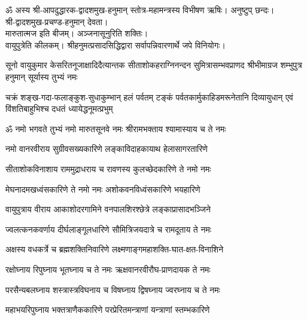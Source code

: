 
ॐ अस्य श्री-आपदुद्धारक-द्वादशमुख-हनुमान् स्तोत्र-महामन्त्रस्य विभीषण ऋषिः। अनुष्टुप् छन्दः।\\
श्री-द्वादशमुख-प्रचण्ड-हनुमान् देवता।\\
 मारुतात्मज इति बीजम्। अञ्जनासूनुरिति शक्तिः।\\
वायुपुत्रेति कीलकम्। श्रीहनुमत्प्रसादसिद्धिद्वारा सर्वापन्निवारणार्थे जपे विनियोगः।

{सूनो वायुकुमार केसरितनूजाक्षादिदैत्यान्तक}
{सीताशोकहराग्निनन्दन सुमित्रासम्भवप्राणद}
{श्रीभीमाग्रज शम्भुपुत्र हनुमान् सूर्यास्य तुभ्यं नमः}

{चक्रं शङ्ख-गदा-फलाङ्कुश-सुधाकुम्भान् हलं पर्वतम्}
{टङ्कं पर्वतकार्मुकाहिडमरूनेतानि दिव्यायुधान्}
{एवं विंशतिबाहुभिश्च दधतं ध्यायेद्धनूमत्प्रभुम्}


\twolineshloka
{ॐ नमो भगवते तुभ्यं नमो मारुतसूनवे}
{नमः श्रीरामभक्ताय श्यामास्याय च ते नमः}

\twolineshloka
{नमो वानरवीराय सुग्रीवसख्यकारिणे}
{लङ्काविदाहकायाथ हेलासागरतारिणे}

\twolineshloka
{सीताशोकविनाशाय राममुद्राधराय च}
{रावणस्य कुलच्छेदकारिणे ते नमो नमः}

\twolineshloka
{मेघनादमखध्वंसकारिणे ते नमो नमः}
{अशोकवनविध्वंसकारिणे भयहारिणे}

\twolineshloka
{वायुपुत्राय वीराय आकाशोदरगामिने}
{वनपालशिरश्छेत्रे लङ्काप्रासादभञ्जिने}

\twolineshloka
{ज्वलत्कनकवर्णाय दीर्घलाङ्गूलधारिणे}
{सौमित्रिजयदात्रे च रामदूताय ते नमः}

\twolineshloka
{अक्षस्य वधकर्त्रे च ब्रह्मशक्तिनिवारिणे}
{लक्ष्मणाङ्गमहाशक्ति-घात-क्षत-विनाशिने}

\twolineshloka
{रक्षोघ्नाय रिपुघ्नाय भूतघ्नाय च ते नमः}
{ऋक्षवानरवीरौघ-प्राणदायक ते नमः}

\twolineshloka
{परसैन्यबलघ्नाय शस्त्रास्त्रविघनाय च}
{विषघ्नाय द्विषघ्नाय ज्वरघ्नाय च ते नमः}

\twolineshloka
{महाभयरिपुघ्नाय भक्तत्राणैककारिणे}
{परप्रेरितमन्त्राणां यन्त्राणां स्तम्भकारिणे}

